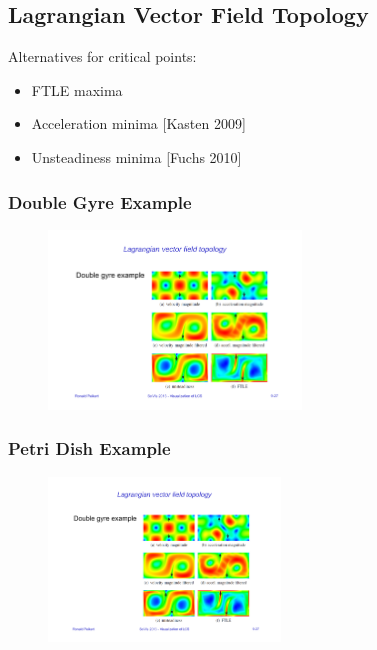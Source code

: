 \subsection{Lagrangian Vector Field Topology}
Alternatives for critical points:
\begin{itemize}
    \item FTLE maxima
    \item Acceleration minima [Kasten 2009]
    \item Unsteadiness minima [Fuchs 2010]
\end{itemize}

\subsubsection{Double Gyre Example}
\begin{figure}[H]
    \centering
    \includegraphics[width=0.6\textwidth,page=1]{img/09_lcs_examples}
\end{figure}

\subsubsection{Petri Dish Example}
\begin{figure}[H]
    \centering
    \includegraphics[width=0.55\textwidth,page=2]{img/09_lcs_examples}
\end{figure}
\newpage

